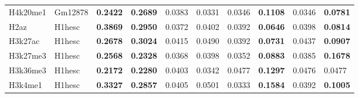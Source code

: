 \begin{table}[!ht]
\begin{tabular}{ll|ll|ll|ll|ll}
H4k20me1                             & Gm12878                                & {\color[HTML]{CB0000} \textbf{0.2422}}                       & {\color[HTML]{CB0000} \textbf{0.2689}}                      & 0.0383                                & 0.0331                               & 0.0346                                & {\color[HTML]{CB0000} \textbf{0.1108}} & 0.0346                                & \textbf{0.0781}                        \\
H2az                                 & H1hesc                                 & {\color[HTML]{CB0000} \textbf{0.3869}}                       & {\color[HTML]{CB0000} \textbf{0.2950}}                      & 0.0372                                & 0.0402                               & 0.0392                                & \textbf{0.0646}                        & 0.0398                                & \textbf{0.0814}                        \\
H3k27ac                              & H1hesc                                 & {\color[HTML]{CB0000} \textbf{0.2678}}                       & {\color[HTML]{CB0000} \textbf{0.3024}}                      & 0.0415                                & 0.0490                               & 0.0392                                & \textbf{0.0731}                        & 0.0437                                & \textbf{0.0907}                        \\
H3k27me3                             & H1hesc                                 & {\color[HTML]{CB0000} \textbf{0.2568}}                       & {\color[HTML]{CB0000} \textbf{0.2328}}                      & 0.0368                                & 0.0398                               & 0.0352                                & \textbf{0.0883}                        & 0.0385                                & {\color[HTML]{CB0000} \textbf{0.1678}} \\
H3k36me3                             & H1hesc                                 & {\color[HTML]{CB0000} \textbf{0.2172}}                       & {\color[HTML]{CB0000} \textbf{0.2280}}                      & 0.0403                                & 0.0342                               & 0.0477                                & {\color[HTML]{CB0000} \textbf{0.1297}} & 0.0476                                & 0.0477                                 \\
H3k4me1                              & H1hesc                                 & {\color[HTML]{CB0000} \textbf{0.3327}}                       & {\color[HTML]{CB0000} \textbf{0.2857}}                      & 0.0405                                & 0.0501                               & 0.0333                                & {\color[HTML]{CB0000} \textbf{0.1584}} & 0.0392                                & {\color[HTML]{CB0000} \textbf{0.1005}} \\

\end{tabular}
\end{table}
